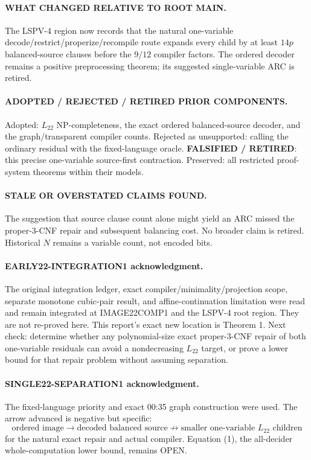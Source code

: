 \documentclass[11pt]{article}
\begin{document}
\paragraph{WHAT CHANGED RELATIVE TO ROOT MAIN.}
The LSPV-4 region now records that the natural one-variable
decode/restrict/properize/recompile route expands every child by at least
$14p$ balanced-source clauses before the $9/12$ compiler factors.  The
ordered decoder remains a positive preprocessing theorem; its suggested
single-variable ARC is retired.

\paragraph{ADOPTED / REJECTED / RETIRED PRIOR COMPONENTS.}
Adopted: $L_{22}$ NP-completeness, the exact ordered balanced-source decoder,
and the graph/transparent compiler counts.  Rejected as unsupported: calling
the ordinary residual with the fixed-language oracle.  \textbf{FALSIFIED /
RETIRED}: this precise one-variable source-first contraction.  Preserved:
all restricted proof-system theorems within their models.

\paragraph{STALE OR OVERSTATED CLAIMS FOUND.}
The suggestion that source clause count alone might yield an ARC missed the
proper-3-CNF repair and subsequent balancing cost.  No broader claim is
retired.  Historical $N$ remains a variable count, not encoded bits.

\paragraph{EARLY22-INTEGRATION1 acknowledgment.}
The original integration ledger, exact compiler/minimality/projection scope,
separate monotone cubic-pair result, and affine-continuation limitation were
read and remain integrated at IMAGE22COMP1 and the LSPV-4 root region.  They
are not re-proved here.  This report's exact new location is Theorem 1.
Next check: determine whether any polynomial-size exact proper-3-CNF repair
of both one-variable residuals can avoid a nondecreasing $L_{22}$ target, or
prove a lower bound for that repair problem without assuming separation.

\paragraph{SINGLE22-SEPARATION1 acknowledgment.}
The fixed-language priority and exact 00:35 graph construction were used.
The arrow advanced is negative but specific:
\[
 \text{ordered image}\to\text{decoded balanced source}
 \not\to\text{smaller one-variable }L_{22}\text{ children}
\]
for the natural exact repair and actual compiler.  Equation (1), the
all-decider whole-computation lower bound, remains OPEN.
\end{document}
